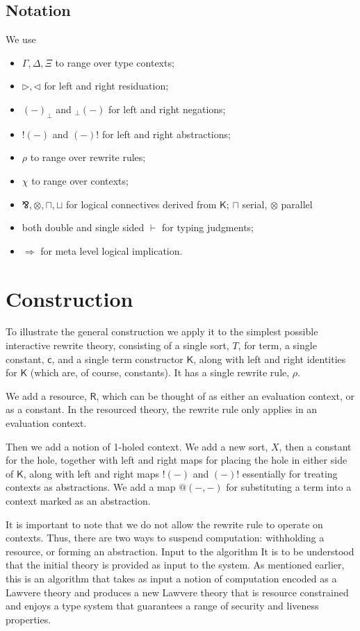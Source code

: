 \documentclass{llncs}
\renewcommand{\:}{\colon}
\begin{document}
\subsection{Notation}
We use 

\begin{itemize}
  \item $\Gamma , \Delta , \Xi$  to range over type contexts;
  \item $\rhd , \lhd$ for left and right residuation;
  \item $(-)_{\perp}$ and $ _{\perp}(-)$  for left and right negations;
  \item $!(-)$ and $(-)!$  for left and right abstractions; 
  \item $\rho$ to range over rewrite rules;
  \item $\chi$ to range over contexts;
  \item $\bindnasrepma, \otimes, \sqcap, \sqcup$ for logical connectives derived from $\mathsf{K}$; $\sqcap$ serial, $\otimes$ parallel
  \item both double and single sided $\vdash$ for typing judgments;
  \item $\Rightarrow$ for meta level logical implication.
\end{itemize}

\section{Construction}
To illustrate the general construction we apply it to the simplest
possible interactive rewrite theory, consisting of a single sort, $T$,
for term, a single constant, $\mathsf{c}$, and a single term constructor $\mathsf{K}$, along
with left and right identities for $\mathsf{K}$ (which are, of course,
constants). It has a single rewrite rule, $\rho$.

We add a resource, $\mathsf{R}$, which can be thought of as either an evaluation
context, or as a constant. In the resourced theory, the rewrite rule
only applies in an evaluation context.

Then we add a notion of 1-holed context. We add a new sort, $X$, then a
constant for the hole, together with left and right maps for placing
the hole in either side of $\mathsf{K}$, along with left and right maps $!(-)$ and
$(-)!$ essentially for treating contexts as abstractions. We add a map
$@(-,-)$ for substituting a term into a context marked as an
abstraction.

It is important to note that we do not allow the rewrite rule to
operate on contexts. Thus, there are two ways to suspend computation:
withholding a resource, or forming an abstraction.  Input to the
algorithm It is to be understood that the initial theory is provided
as input to the system. As mentioned earlier, this is an algorithm
that takes as input a notion of computation encoded as a Lawvere
theory and produces a new Lawvere theory that is resource constrained
and enjoys a type system that guarantees a range of security and
liveness properties.
\end{document}
